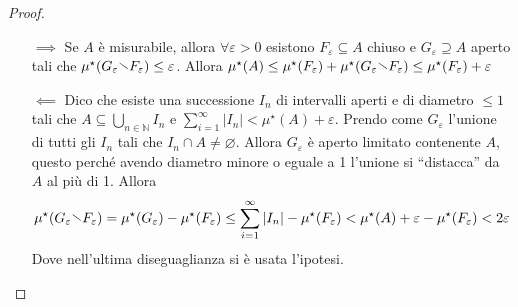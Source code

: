 \begin{proof}\( \)
\begin{itemize}
    \item[\(\implies \)] Se \(A\) è misurabile, allora \(\forall \varepsilon > 0\)
        esistono \(F_{\varepsilon} \subseteq A \) chiuso e \(G_{\varepsilon}
        \supseteq A \) aperto tali che \(\mu^\star(G_{\varepsilon} \sminus
        F_{\varepsilon}) \le \varepsilon\). Allora \(\mu^\star(A) \le
        \mu^\star(F_\varepsilon) + \mu^\star(G_\varepsilon \sminus
        F_\varepsilon) \le \mu^\star(F_\varepsilon) + \varepsilon\) 
    \item[\(\impliedby \)] Dico che esiste una successione \(I_{n}\) di
        intervalli aperti e di diametro \(\le  1\) tali che \(A \subseteq
        \bigcup_{n \in \mathbb{N}} I_{n}  \) e \(\sum_{i=1}^{\infty} |I_{n}| <
        \mu^\star(A) + \varepsilon \). Prendo come \(G_\varepsilon\) l'unione di
        tutti gli \(I_{n}\) tali che \(I_{n} \cap A \neq \varnothing\). Allora
        \(G_\varepsilon\) è aperto limitato contenente \(A\), questo perché
        avendo diametro minore o eguale a 1 l'unione si ``distacca'' da \(A\) al
        più di 1. Allora \[\mu^\star(G_\varepsilon \sminus F_\varepsilon) =
        \mu^\star(G_\varepsilon) - \mu^\star(F_\varepsilon) \le
        \sum_{i=1}^{\infty} |I_n| - \mu^\star(F_\varepsilon) < \mu^\star(A) +
        \varepsilon - \mu^\star(F_\varepsilon) < 2\varepsilon \] 
        Dove nell'ultima diseguaglianza si è usata l'ipotesi.
\end{itemize}
\end{proof}

